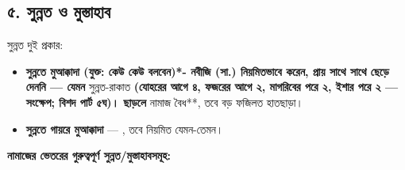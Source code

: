 \subsection*{৫. সুন্নত ও মুস্তাহাব}

সুন্নত দুই প্রকার:

\begin{itemize}
\item \textbf{সুন্নতে মুআক্কাদা (যুক্ত: কেউ কেউ বলবেন)*- নবীজি (সা.) নিয়মিতভাবে করেন, প্রায় সাথে সাথে ছেড়ে দেননি — যেমন }সুন্নত-রাকাত\textbf{ (যোহরের আগে ৪, ফজরের আগে ২, মাগরিবের পরে ২, ইশার পরে ২ — সংক্ষেপ; বিশদ পার্ট ৫ঘ)। ছাড়লে }নামাজ বৈধ**, তবে বড় ফজিলত হাতছাড়া।
\item \textbf{সুন্নতে গায়রে মুআক্কাদা} — , তবে নিয়মিত যেমন-তেমন।
\end{itemize}
\textbf{নামাজের ভেতরের গুরুত্বপূর্ণ সুন্নত/মুস্তাহাবসমূহ:}

